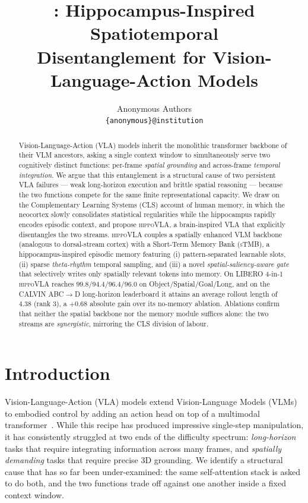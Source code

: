 \documentclass[10pt,letterpaper]{article}
\title{\method: Hippocampus-Inspired Spatiotemporal\\
Disentanglement for Vision-Language-Action Models}
\author{
    Anonymous Authors\\
    \texttt{\{anonymous\}@institution}
}
\date{}
\newcommand{\method}{\textsc{hippoVLA}\xspace}
\newcommand{\sTMB}{\textsc{sTMB}\xspace}
\begin{document}
\maketitle

\begin{abstract}
Vision-Language-Action (VLA) models inherit the monolithic transformer backbone of their VLM ancestors, asking a single context window to simultaneously serve two cognitively distinct functions: per-frame \emph{spatial grounding} and across-frame \emph{temporal integration}. We argue that this entanglement is a structural cause of two persistent VLA failures --- weak long-horizon execution and brittle spatial reasoning --- because the two functions compete for the same finite representational capacity.
We draw on the Complementary Learning Systems (CLS) account of human memory, in which the neocortex slowly consolidates statistical regularities while the hippocampus rapidly encodes episodic context, and propose \method, a brain-inspired VLA that explicitly disentangles the two streams. \method couples a spatially enhanced VLM backbone (analogous to dorsal-stream cortex) with a Short-Term Memory Bank (\sTMB), a hippocampus-inspired episodic memory featuring (i) pattern-separated learnable slots, (ii) sparse \emph{theta-rhythm} temporal sampling, and (iii) a novel \emph{spatial-saliency-aware gate} that selectively writes only spatially relevant tokens into memory. On LIBERO 4-in-1 \method reaches $99.8/94.4/96.4/96.0$ on Object/Spatial/Goal/Long, and on the CALVIN ABC$\rightarrow$D long-horizon leaderboard it attains an average rollout length of $4.38$ (rank 3), a $+0.68$ absolute gain over its no-memory ablation. Ablations confirm that neither the spatial backbone nor the memory module suffices alone: the two streams are \emph{synergistic}, mirroring the CLS division of labour.
\end{abstract}

\section{Introduction}
\label{sec:intro}

Vision-Language-Action (VLA) models extend Vision-Language Models (VLMs) to embodied control by adding an action head on top of a multimodal transformer~\citep{black2024pi0,kim2024openvla,brohan2023rt2}. While this recipe has produced impressive single-step manipulation, it has consistently struggled at two ends of the difficulty spectrum: \emph{long-horizon} tasks that require integrating information across many frames, and \emph{spatially demanding} tasks that require precise 3D grounding. We identify a structural cause that has so far been under-examined: the same self-attention stack is asked to do both, and the two functions trade off against one another inside a fixed context window.
\end{document}
